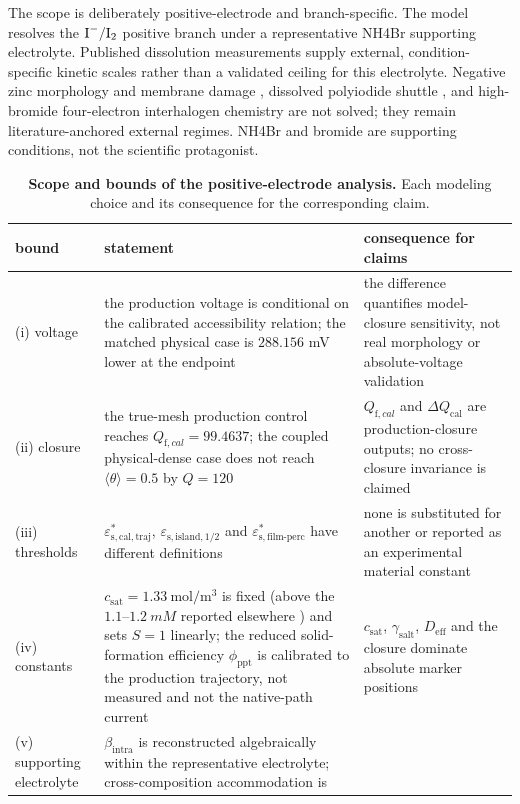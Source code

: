 \documentclass[11pt]{article}
\newcommand{\csat}{c_{\mathrm{sat}}}
\newcommand{\epscalstar}{\varepsilon_{\mathrm{s,cal,traj}}^{*}}
\newcommand{\epsislandhalf}{\varepsilon_{\mathrm{s,island},1/2}}
\newcommand{\epsfilmperc}{\varepsilon_{\mathrm{s,film\text{-}perc}}^{*}}
\begin{document}
The scope is deliberately positive-electrode and branch-specific. The model resolves the
$\ce{I^-}/\ce{I2}$ positive branch under a representative NH4Br supporting electrolyte. Published
dissolution measurements supply external, condition-specific kinetic scales rather than a validated ceiling
for this electrolyte. Negative zinc morphology and membrane damage \citep{Richtr2026,Guo2025}, dissolved
polyiodide shuttle \citep{Wei2025}, and high-bromide four-electron interhalogen chemistry
\citep{Liao2025,HuangIL2025,ChenComplex2026} are not solved; they remain literature-anchored external regimes.
NH4Br and bromide are supporting conditions, not the scientific protagonist.

\begin{table}[h]\centering\small
\caption{\textbf{Scope and bounds of the positive-electrode analysis.} Each modeling choice and its
consequence for the corresponding claim.}
\label{tab:bounds}
\begin{tabular}{p{}p{}p{}}
\toprule
bound & statement & consequence for claims \\
\midrule
(i) voltage &
the production voltage is conditional on the calibrated accessibility relation; the matched physical case is
$288.156$ mV lower at the endpoint &
the difference quantifies model-closure sensitivity, not real morphology or absolute-voltage validation \\
(ii) closure &
the true-mesh production control reaches $Q_{\mathrm f,cal}=99.4637$; the coupled physical-dense case does not reach
$\langle\theta\rangle=0.5$ by $Q=120$ &
$Q_{\mathrm f,cal}$ and $\Delta Q_{\mathrm{cal}}$ are production-closure outputs; no cross-closure invariance is claimed \\
(iii) thresholds &
$\epscalstar$, $\epsislandhalf$ and $\epsfilmperc$ have different definitions &
none is substituted for another or reported as an experimental material constant \\
(iv) constants &
$\csat=\SI{1.33}{\mol\per\meter\cubed}$ is fixed \citep{Ramette1965} (above the $1.1$--$\SI{1.2}{mM}$
reported elsewhere \citep{Bentley2015,Lee2023}) and sets $S=1$ linearly; the reduced solid-formation efficiency
$\phi_{\mathrm{ppt}}$ is calibrated to the production trajectory, not measured and not the native-path current &
$\csat$, $\gamma_{\mathrm{salt}}$, $D_{\mathrm{eff}}$ and the closure dominate absolute marker positions \\
(v) supporting electrolyte &
$\beta_{\mathrm{intra}}$ is reconstructed algebraically within the representative electrolyte; cross-composition accommodation is

\end{tabular}
\end{table}
\end{document}
